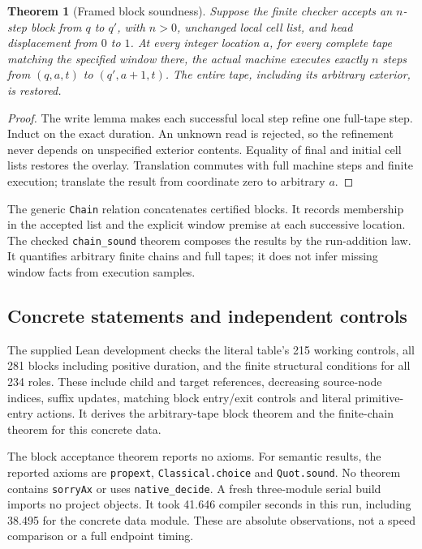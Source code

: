 \documentclass[11pt]{article}
\newtheorem{theorem}{Theorem}[section]
\newcommand{\code}[1]{\texttt{\small #1}}
\begin{document}
\begin{theorem}[Framed block soundness]
Suppose the finite checker accepts an $n$-step block from $q$ to $q'$, with
$n>0$, unchanged local cell list, and head displacement from $0$ to $1$.
At every integer location $a$, for every complete tape matching the specified
window there, the actual machine executes exactly $n$ steps from $(q,a,t)$
to $(q',a+1,t)$. The entire tape, including its arbitrary exterior, is restored.
\end{theorem}
\begin{proof}
The write lemma makes each successful local step refine one full-tape step.
Induct on the exact duration. An unknown read is rejected, so the refinement
never depends on unspecified exterior contents. Equality of final and initial
cell lists restores the overlay. Translation commutes with full machine steps
and finite execution; translate the result from coordinate zero to arbitrary
$a$.
\end{proof}

The generic \code{Chain} relation concatenates certified blocks. It records
membership in the accepted list and the explicit window premise at each
successive location. The checked \code{chain\_sound} theorem composes the results
by the run-addition law. It quantifies arbitrary finite chains and full tapes;
it does not infer missing window facts from execution samples.

\subsection{Concrete statements and independent controls}

The supplied Lean development checks the literal table's 215 working controls,
all 281 blocks including positive duration, and the finite structural
conditions for all 234 roles. These include child and target references,
decreasing source-node indices, suffix updates, matching block entry/exit
controls and literal primitive-entry actions. It derives the arbitrary-tape
block theorem and the finite-chain theorem for this concrete data.

The block acceptance theorem reports no axioms. For semantic results, the
reported axioms are \code{propext}, \code{Classical.choice} and \code{Quot.sound}.
No theorem contains
\code{sorryAx} or uses \code{native\_decide}. A fresh three-module serial build
imports no project objects. It took 41.646 compiler seconds in this run,
including 38.495 for the concrete data module. These are absolute observations,
not a speed comparison or a full endpoint timing.
\end{document}
